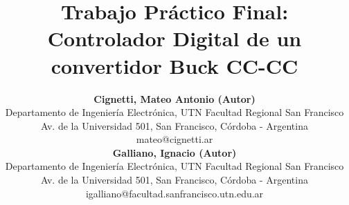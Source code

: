 \documentclass[12pt, a4paper, fleqn]{article}
\title{Trabajo Práctico Final: Controlador Digital de un convertidor Buck CC-CC}
\author{\textbf{Cignetti, Mateo Antonio (Autor)} \\ Departamento de Ingeniería Electrónica, UTN Facultad Regional San Francisco \\
        Av. de la Universidad 501, San Francisco, Córdoba - Argentina \\ mateo@cignetti.ar \\ \vspace{0.5cm}
        \textbf{Galliano, Ignacio (Autor)} \\ Departamento de Ingeniería Electrónica, UTN Facultad Regional San Francisco \\
        Av. de la Universidad 501, San Francisco, Córdoba - Argentina \\ igalliano@facultad.sanfrancisco.utn.edu.ar \\ \vspace{0.5cm}}
\date{}
\begin{document}
    \maketitle
    \thispagestyle{fancy}

    
    

    
    
    
    \newpage
    

    \newpage
    \renewcommand{\refname}{\large REFERENCIAS}
    \begin{minipage}{0.9\textwidth}
    \printbibliography
    \end{minipage}
\end{document}
